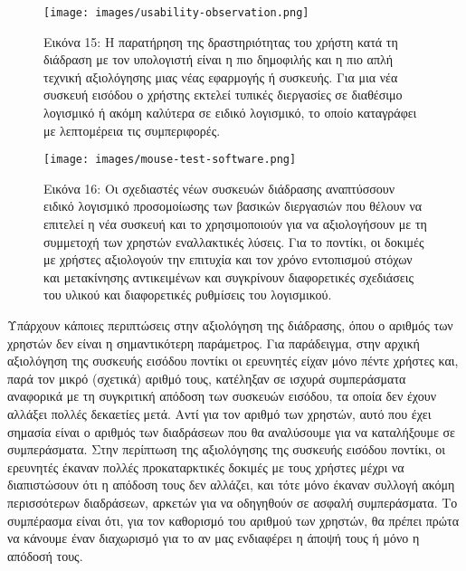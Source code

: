 \documentclass[
]{article}
\begin{document}
\leavevmode{}%
\begin{figure}
\hypertarget{fig:usability-observation}{%
\centering
\texttt{[image: images/usability-observation.png]}
\caption{Εικόνα 15: Η παρατήρηση της δραστηριότητας του χρήστη κατά τη
διάδραση με τον υπολογιστή είναι η πιο δημοφιλής και η πιο απλή τεχνική
αξιολόγησης μιας νέας εφαρμογής ή συσκευής. Για μια νέα συσκευή εισόδου
ο χρήστης εκτελεί τυπικές διεργασίες σε διαθέσιμο λογισμικό ή ακόμη
καλύτερα σε ειδικό λογισμικό, το οποίο καταγράφει με λεπτομέρεια τις
συμπεριφορές.}\label{fig:usability-observation}
}
\end{figure}

\leavevmode{}%
\begin{figure}
\hypertarget{fig:mouse-test-software}{%
\centering
\texttt{[image: images/mouse-test-software.png]}
\caption{Εικόνα 16: Οι σχεδιαστές νέων συσκευών διάδρασης αναπτύσσουν
ειδικό λογισμικό προσομοίωσης των βασικών διεργασιών που θέλουν να
επιτελεί η νέα συσκευή και το χρησιμοποιούν για να αξιολογήσουν με τη
συμμετοχή των χρηστών εναλλακτικές λύσεις. Για το ποντίκι, οι δοκιμές με
χρήστες αξιολογούν την επιτυχία και τον χρόνο εντοπισμού στόχων και
μετακίνησης αντικειμένων και συγκρίνουν διαφορετικές σχεδιάσεις του
υλικού και διαφορετικές ρυθμίσεις του
λογισμικού.}\label{fig:mouse-test-software}
}
\end{figure}

Υπάρχουν κάποιες περιπτώσεις στην αξιολόγηση της διάδρασης, όπου ο
αριθμός των χρηστών δεν είναι η σημαντικότερη παράμετρος. Για
παράδειγμα, στην αρχική αξιολόγηση της συσκευής εισόδου ποντίκι οι
ερευνητές είχαν μόνο πέντε χρήστες και, παρά τον μικρό (σχετικά) αριθμό
τους, κατέληξαν σε ισχυρά συμπεράσματα αναφορικά με τη συγκριτική
απόδοση των συσκευών εισόδου, τα οποία δεν έχουν αλλάξει πολλές
δεκαετίες μετά. Αντί για τον αριθμό των χρηστών, αυτό που έχει σημασία
είναι ο αριθμός των διαδράσεων που θα αναλύσουμε για να καταλήξουμε σε
συμπεράσματα. Στην περίπτωση της αξιολόγησης της συσκευής εισόδου
ποντίκι, οι ερευνητές έκαναν πολλές προκαταρκτικές δοκιμές με τους
χρήστες μέχρι να διαπιστώσουν ότι η απόδοση τους δεν αλλάζει, και τότε
μόνο έκαναν συλλογή ακόμη περισσότερων διαδράσεων, αρκετών για να
οδηγηθούν σε ασφαλή συμπεράσματα. Το συμπέρασμα είναι ότι, για τον
καθορισμό του αριθμού των χρηστών, θα πρέπει πρώτα να κάνουμε έναν
διαχωρισμό για το αν μας ενδιαφέρει η άποψή τους ή μόνο η απόδοσή τους.
\end{document}
